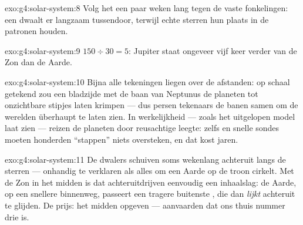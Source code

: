 \begin{solution}{exo:g4:solar-system:8}
Volg het een paar weken lang tegen de vaste fonkelingen: een
 dwaalt er langzaam tussendoor, terwijl echte sterren hun
plaats in de patronen houden.
\end{solution}

\begin{solution}{exo:g4:solar-system:9}
$150 \div 30 = 5$: Jupiter staat ongeveer vijf keer verder van de Zon
dan de Aarde.
\end{solution}

\begin{solution}{exo:g4:solar-system:10}
Bijna alle tekeningen liegen over de afstanden: op schaal getekend zou
een bladzijde met de baan van Neptunus de planeten tot onzichtbare
stipjes laten krimpen --- dus persen tekenaars de banen samen om de
werelden überhaupt te laten zien. In werkelijkheid --- zoals het
uitgelopen model laat zien --- reizen de planeten door reusachtige
leegte: zelfs  en snelle sondes moeten honderden ``stappen''
niets oversteken, en dat kost jaren.
\end{solution}

\begin{solution}{exo:g4:solar-system:11}
De dwalers schuiven soms wekenlang achteruit langs de sterren ---
onhandig te verklaren als alles om een Aarde op de troon cirkelt. Met
de Zon in het midden is dat achteruitdrijven eenvoudig een inhaalslag:
de Aarde, op een snellere binnenweg, passeert een tragere buitenste
, die dan \emph{lijkt} achteruit te glijden. De prijs: het
midden opgeven --- aanvaarden dat ons thuis  nummer drie is.
\end{solution}

